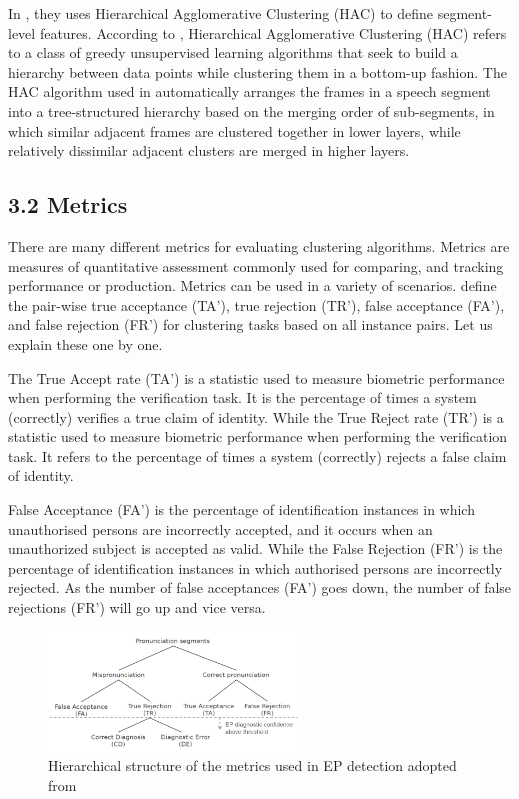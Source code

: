 \documentclass[nobib]{tufte-handout}
\begin{document}
In \cite{wang2015supervised}, they uses Hierarchical Agglomerative Clustering (HAC) to define segment-level features. According to \cite{chhabra2020fair}, Hierarchical Agglomerative Clustering (HAC) refers to a class of greedy unsupervised learning algorithms that seek to build a hierarchy between data points while clustering them in a bottom-up fashion. The HAC algorithm used in \cite{wang2015supervised} automatically arranges the frames in a speech segment into a tree-structured hierarchy based on the merging order of sub-segments, in which similar adjacent frames are clustered together in lower layers, while relatively dissimilar adjacent clusters are merged in higher layers. 


\subsection{\textbf{3.2 Metrics}}

There are many different metrics for evaluating clustering algorithms. 
Metrics are measures of quantitative assessment commonly used for comparing, and tracking performance or production. Metrics can be used in a variety of scenarios.  \cite{wang2015supervised}  define the pair-wise true acceptance (TA’), true rejection (TR’), false acceptance (FA’), and false rejection (FR’) for clustering tasks based on all instance pairs. Let us explain these one by one. 

The True Accept rate (TA’) is a statistic used to measure biometric performance when performing the verification task. It is the percentage of times a system (correctly) verifies a true claim of identity. While the True Reject rate (TR’) is a statistic used to measure biometric performance when performing the verification task. It refers to the percentage of times a system (correctly) rejects a false claim of identity.


False Acceptance (FA’) is the percentage of identification instances in which unauthorised persons are incorrectly accepted, and it occurs when an unauthorized subject is accepted as valid. While the False Rejection (FR') is the percentage of identification instances in which authorised persons are incorrectly rejected. As the number of false acceptances (FA') goes down, the number of false rejections (FR') will go up and vice versa.

\begin{figure}
 \includegraphics[width=0.6\textwidth]{metrics.png}
  \caption{Hierarchical structure of the metrics used in EP detection adopted from  \cite{wang2015supervised}}
\end{figure}
\end{document}
